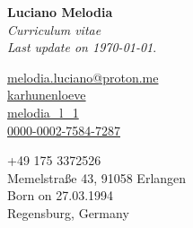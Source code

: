 \documentclass[a4paper,12pt]{article}
\begin{document}
{
    {
        \Huge \textbf{Luciano Melodia}}\\[0.1cm]
    \emph{Curriculum vitae}\\
    \emph{Last update on \today}.
    
    \begin{flushleft}
        \scriptsize
        \begin{minipage}{0.3\textwidth}
            {\footnotesize \faEnvelope} \hspace{0.1cm} \href{mailto:melodia.luciano@proton.me}{melodia.luciano@proton.me}\\[0.05cm]
            {\footnotesize \faGithub} \hspace{0.15cm} \href{https://github.com/karhunenloeve}{karhunenloeve}\\[0.05cm]
            {\footnotesize \aiarXiv} \hspace{0.1cm} \href{https://arxiv.org/a/melodia_l_1}{melodia\_l\_1}\\[0.05cm]
            {\footnotesize \aiOrcid} \hspace{0.1cm} \href{https://orcid.org/0000-0002-7584-7287}{0000-0002-7584-7287}
        \end{minipage}
        \begin{minipage}{0.4\textwidth}
            {\footnotesize \faPhone} \hspace{0.20cm} +49 175 3372526 \\[0.05cm]
            {\footnotesize \faMapPin} \hspace{0.30cm} Memelstraße 43, 91058 Erlangen\\[0.05cm]
            {\footnotesize \faMars} \hspace{0.2cm} Born on 27.03.1994\\[0.05cm]
            {\footnotesize \faMapO} \hspace{0.1cm} Regensburg, Germany
        \end{minipage}
    \end{flushleft}
}

\end{document}
